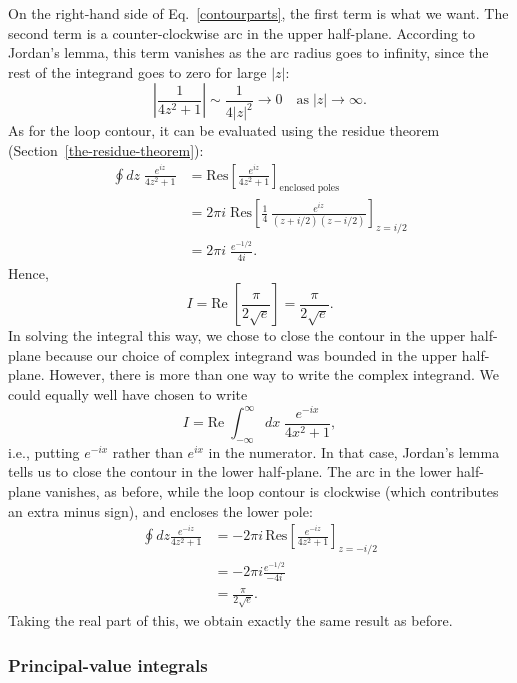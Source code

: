 \documentclass[10pt,a4paper]{article}
\begin{document}
On the right-hand side of Eq.~\eqref{contourparts}, the first term is
what we want. The second term is a counter-clockwise arc in the upper
half-plane. According to Jordan's lemma, this term vanishes as the arc
radius goes to infinity, since the rest of the integrand goes to zero
for large $|z|$:
\begin{equation}
\left|\frac{1}{4z^2 + 1}\right| \sim \frac{1}{4|z|^2} \rightarrow 0 \quad \mathrm{as} \;|z| \rightarrow \infty.
\end{equation}
As for the loop contour, it can be evaluated using the residue theorem
(Section~\ref{the-residue-theorem}):
\begin{align}
  \oint dz \; \frac{e^{iz}}{4z^2 + 1}
  &= \mathrm{Res}\left[\frac{e^{iz}}{4z^2 + 1}\right]_{\mathrm{enclosed}\;\mathrm{poles}}\\ &= 2\pi i \; \mathrm{Res}\left[\frac{1}{4}\, \frac{e^{iz}}{(z+i/2)(z-i/2)}\right]_{z = i/2} \\ &= 2\pi i \; \frac{e^{-1/2}}{4i}.
\end{align}
Hence,
\begin{equation}
I = \mathrm{Re}\;\left[\frac{\pi}{2\sqrt{e}}\right]= \frac{\pi}{2\sqrt{e}}.
\end{equation}
In solving the integral this way, we chose to close the contour in the
upper half-plane because our choice of complex integrand was bounded in
the upper half-plane. However, there is more than one way to write the
complex integrand. We could equally well have chosen to write
\begin{equation}
I = \mathrm{Re} \; \int_{-\infty}^\infty dx\; \frac{e^{-ix}}{4x^2 + 1},
\end{equation}
i.e., putting $e^{-ix}$ rather than $e^{ix}$ in the numerator. In
that case, Jordan's lemma tells us to close the contour in the lower
half-plane. The arc in the lower half-plane vanishes, as before, while
the loop contour is clockwise (which contributes an extra minus sign),
and encloses the lower pole:
\begin{align}
  \oint dz \frac{e^{-iz}}{4z^2 + 1} &= -2\pi i \, \mathrm{Res}\left[ \frac{e^{-iz}}{4z^2 + 1} \right]_{z = -i/2} \\ &= - 2\pi i \frac{e^{-1/2}}{-4i} \\ &= \frac{\pi}{2\sqrt{e}}.
\end{align}
Taking the real part of this, we obtain exactly the same result as
before.

\subsubsection{Principal-value integrals}
\label{principal-value-integrals}
\end{document}
